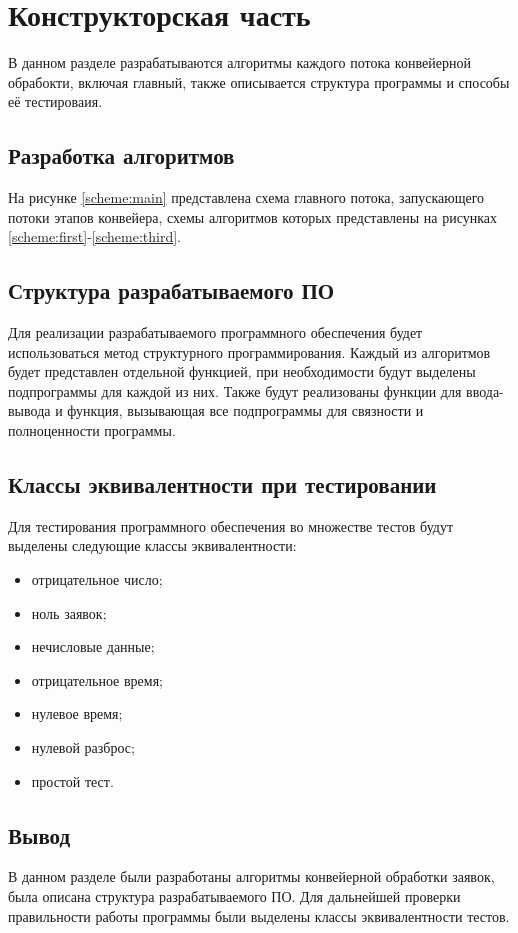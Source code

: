 \chapter{Конструкторская часть}

В данном разделе разрабатываются алгоритмы каждого потока конвейерной
обрабокти, включая главный, также описывается структура программы и способы её
тестироваия.

\section{Разработка алгоритмов}

На рисунке \ref{scheme:main} представлена схема главного потока,
запускающего потоки этапов конвейера, схемы алгоритмов которых представлены на
рисунках \ref{scheme:first}-\ref{scheme:third}.

\noindent
{}
\noindent
{}
\noindent
{}

\section{Структура разрабатываемого ПО}

Для реализации разрабатываемого программного обеспечения будет использоваться
метод структурного программирования. Каждый из алгоритмов будет представлен
отдельной функцией, при необходимости будут выделены подпрограммы для каждой из
них. Также будут реализованы функции для ввода-вывода и функция, вызывающая все
подпрограммы для связности и полноценности программы.

\section{Классы эквивалентности при тестировании}

Для тестирования программного обеспечения во множестве тестов будут выделены
следующие классы эквивалентности:
\begin{itemize}[left=\parindent]
    \item отрицательное число;
    \item ноль заявок; 
    \item нечисловые данные;
    \item отрицательное время;
    \item нулевое время;
    \item нулевой разброс;
    \item простой тест.
\end{itemize}

\section{Вывод}

В данном разделе были разработаны алгоритмы конвейерной обработки заявок, была
описана структура разрабатываемого ПО. Для дальнейшей проверки правильности
работы программы были выделены классы эквивалентности тестов.
